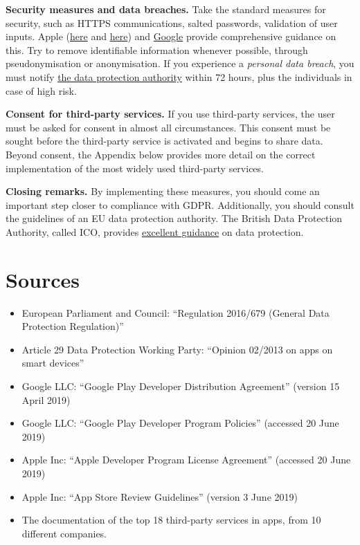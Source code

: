 \documentclass[
]{book}
\providecommand{\tightlist}{%
  \setlength{\itemsep}{0pt}\setlength{\parskip}{0pt}}
\begin{document}
\textbf{Security measures and data breaches.} Take the standard measures for security, such as HTTPS communications, salted passwords, validation of user inputs. Apple (\href{https://developer.apple.com/documentation/security}{here} and \href{https://developer.apple.com/library/archive/documentation/Security/Conceptual/SecureCodingGuide}{here}) and \href{https://developer.android.com/training/articles/security-tips}{Google} provide comprehensive guidance on this. Try to remove identifiable information whenever possible, through pseudonymisation or anonymisation. If you experience a \emph{personal data breach}, you must notify \href{https://edpb.europa.eu/about-edpb/board/members}{the data protection authority} within 72 hours, plus the individuals in case of high risk.

\textbf{Consent for third-party services.} If you use third-party services, the user must be asked for consent in almost all circumstances. This consent must be sought before the third-party service is activated and begins to share data. Beyond consent, the Appendix below provides more detail on the correct implementation of the most widely used third-party services.

\textbf{Closing remarks.} By implementing these measures, you should come an important step closer to compliance with GDPR. Additionally, you should consult the guidelines of an EU data protection authority. The British Data Protection Authority, called ICO, provides \href{https://ico.org.uk/for-organisations/}{excellent guidance} on data protection.

\hypertarget{sources}{%
\section{Sources}\label{sources}}

\begin{itemize}
\tightlist
\item
  European Parliament and Council: ``Regulation 2016/679 (General Data Protection Regulation)''
\item
  Article 29 Data Protection Working Party: ``Opinion 02/2013 on apps on smart devices''
\item
  Google LLC: ``Google Play Developer Distribution Agreement'' (version 15 April 2019)
\item
  Google LLC: ``Google Play Developer Program Policies'' (accessed 20 June 2019)
\item
  Apple Inc: ``Apple Developer Program License Agreement'' (accessed 20 June 2019)
\item
  Apple Inc: ``App Store Review Guidelines'' (version 3 June 2019)
\item
  The documentation of the top 18 third-party services in apps, from 10 different companies.
\end{itemize}
\end{document}
